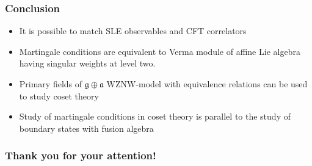 \documentclass[pdftex]{beamer}
\newcommand{\gf}{\mathfrak{g}}
\newcommand{\af}{\mathfrak{a}}
\theoremstyle{definition} \newtheorem{Def}{Definition}
\begin{document}
\begin{frame}
  \frametitle{Conclusion}
  \begin{itemize}
  \item It is possible to match SLE observables and CFT correlators
  \item Martingale conditions are equivalent to Verma module of affine Lie algebra having singular weights at level two.
  \item Primary fields of $\gf\oplus \af$ WZNW-model with equivalence relations can be used to study coset theory
  \item Study of martingale conditions in coset theory is parallel to the study of boundary states with fusion algebra
  \end{itemize}
\end{frame}

\begin{frame}
  \frametitle{Thank you for your attention!}
\end{frame}
\end{document}
